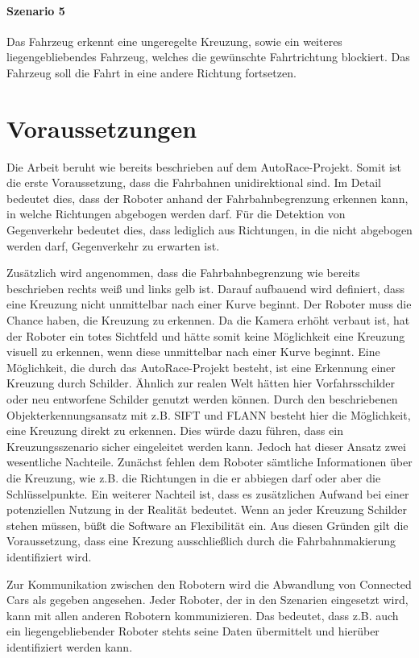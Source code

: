 \paragraph{Szenario 5}
\label{Szenario 5}
Das Fahrzeug erkennt eine ungeregelte Kreuzung, sowie ein weiteres liegengebliebendes Fahrzeug, welches die gewünschte Fahrtrichtung blockiert. Das Fahrzeug soll die Fahrt in eine andere
Richtung fortsetzen.

\section{Voraussetzungen}
Die Arbeit beruht wie bereits beschrieben auf dem AutoRace-Projekt. Somit ist die erste Voraussetzung, dass die Fahrbahnen unidirektional sind. Im Detail bedeutet dies, dass
der Roboter anhand der Fahrbahnbegrenzung erkennen kann, in welche Richtungen abgebogen werden darf. Für die Detektion von Gegenverkehr bedeutet dies, dass lediglich aus Richtungen,
in die nicht abgebogen werden darf, Gegenverkehr zu erwarten ist.

Zusätzlich wird angenommen, dass die Fahrbahnbegrenzung wie bereits beschrieben rechts weiß und links gelb ist. Darauf aufbauend wird definiert, dass eine Kreuzung nicht unmittelbar
nach einer Kurve beginnt. Der Roboter muss die Chance haben, die Kreuzung zu erkennen. Da die Kamera erhöht verbaut ist, hat der Roboter ein totes Sichtfeld und hätte somit keine Möglichkeit
eine Kreuzung visuell zu erkennen, wenn diese unmittelbar nach einer Kurve beginnt.
Eine Möglichkeit, die durch das AutoRace-Projekt besteht, ist eine Erkennung einer Kreuzung durch Schilder. Ähnlich zur realen Welt hätten hier Vorfahrsschilder 
oder neu entworfene Schilder genutzt werden können. Durch den beschriebenen Objekterkennungsansatz mit z.B. SIFT und FLANN besteht hier die Möglichkeit, eine Kreuzung direkt zu erkennen.
Dies würde dazu führen, dass ein Kreuzungsszenario sicher eingeleitet werden kann. Jedoch hat dieser Ansatz zwei wesentliche Nachteile. Zunächst fehlen dem Roboter sämtliche Informationen
über die Kreuzung, wie z.B. die Richtungen in die er abbiegen darf oder aber die Schlüsselpunkte. Ein weiterer Nachteil ist, dass es zusätzlichen Aufwand bei einer potenziellen
Nutzung in der Realität bedeutet. Wenn an jeder Kreuzung Schilder stehen müssen, büßt die Software an Flexibilität ein.
Aus diesen Gründen gilt die Voraussetzung, dass eine Krezung ausschließlich durch die Fahrbahnmakierung identifiziert wird.

Zur Kommunikation zwischen den Robotern wird die Abwandlung von Connected Cars als gegeben angesehen. Jeder Roboter, der in den Szenarien eingesetzt wird, kann mit allen anderen
Robotern kommunizieren. Das bedeutet, dass z.B. auch ein liegengebliebender Roboter stehts seine Daten übermittelt und hierüber identifiziert werden kann.

